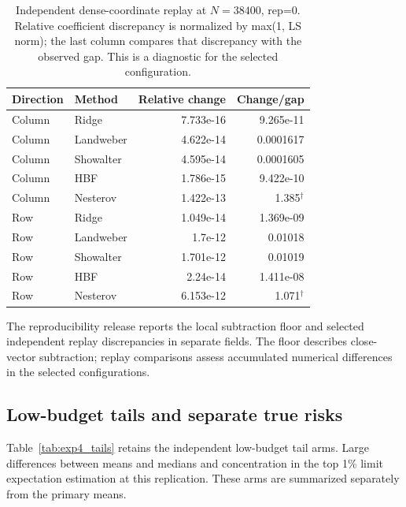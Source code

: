 \documentclass[11pt,a4paper,leqno]{article}
\numberwithin{equation}{section}
\numberwithin{figure}{section}
\numberwithin{table}{section}
\theoremstyle{plain}
\theoremstyle{definition}
\theoremstyle{remark}
\begin{document}
\begin{table}[!htbp]\centering\small
\caption{Independent dense-coordinate replay at $N=38400$, rep=0. Relative coefficient discrepancy is normalized by max(1, LS norm); the last column compares that discrepancy with the observed gap. This is a diagnostic for the selected configuration.}
\label{tab:exp4_replay}
\begin{tabular}{llrr}\toprule
Direction & Method & Relative change & Change/gap \\\midrule
Column & Ridge & 7.733e-16 & 9.265e-11 \\
Column & Landweber & 4.622e-14 & 0.0001617 \\
Column & Showalter & 4.595e-14 & 0.0001605 \\
Column & HBF & 1.786e-15 & 9.422e-10 \\
Column & Nesterov & 1.422e-13 & 1.385$^{\dagger}$ \\
Row & Ridge & 1.049e-14 & 1.369e-09 \\
Row & Landweber & 1.7e-12 & 0.01018 \\
Row & Showalter & 1.701e-12 & 0.01019 \\
Row & HBF & 2.24e-14 & 1.411e-08 \\
Row & Nesterov & 6.153e-12 & 1.071$^{\dagger}$ \\
\bottomrule\end{tabular}
\end{table}


The reproducibility release reports the local subtraction floor and selected
independent replay discrepancies in separate fields. The floor describes
close-vector subtraction; replay comparisons assess accumulated numerical
differences in the selected configurations.

\subsection{Low-budget tails and separate true risks}
Table~\ref{tab:exp4_tails} retains the independent low-budget tail arms.
Large differences between means and medians and concentration in the top
1\% limit expectation estimation at this replication. These arms are
summarized separately from the primary means.
\end{document}
